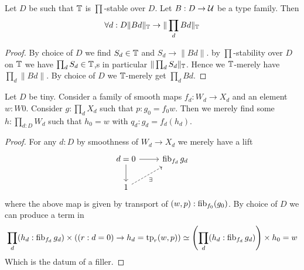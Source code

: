 \begin{lemma}{\label{lemma:TinyStrongLocalChoice}}
	Let $D$ be such that $\mathbb{T}$ is $\prod$-stable over $D$. Let $B : D \to \mathcal{U}$ be a type family. Then
	\[
	\forall d:D \|B d\|_{\mathbb{T}} \to \| \prod_d B d\|_{\mathbb{T}}
	\]		
\end{lemma}
\begin{proof}
	By choice of $D$ we find $S_d \in \mathbb{T}$ and $S_d \to \|B d\|$. by $\prod$-stability over $D$ on $\mathbb{T}$ we have $\prod_d S_d \in \mathbb{T}$,s  in particular $\| \prod_d S_d \|_{\mathbb{T}}$. Hence we $\mathbb{T}$-merely have $\prod_d \| B d\|.$ By choice of $D$ we $\mathbb{T}$-merely get $\prod_d B d$. 
	
\end{proof}
\begin{lemma}[NEEDED?]
	Let $D$ be tiny. Consider a family of smooth maps $f_d : W_d \to X_d$ and an element $w : W 0$.
	Consider $g : \prod_d X_d$ such that $p : g_0 = f_0 w$. Then we merely find some $h : \prod_{d: D} W_d$ such that $h_0 = w$ with $q_d : g_d = f_d (h_d) $.
	
\end{lemma}
\begin{proof}
	For any $d : D$ by smoothness of $W_d \to X_d$ we merely have a lift 
	\[\begin{tikzcd}
		{d=0} & {\fib_{f_d} g_d} \\
		1
		\arrow[from=1-1, to=1-2]
		\arrow[from=1-1, to=2-1]
		\arrow["\exists"', dashed, from=2-1, to=1-2]
	\end{tikzcd}\]
	where the above map is given by transport of $(w , p) : \operatorname{fib}_{f_0}(g_0)$.
	By choice of $D$ we can produce a term in 
	\[
	\prod_d (h_d : \operatorname{fib}_{f_d} g_d) \times ((r : d = 0) \to  h_d = \mathrm{tp}_r(w,p)) \simeq \left(\prod_d (h_d : \operatorname{fib}_{f_d} g_d) \right) \times h_0 = w 
	\]
	Which is the datum of a filler.
\end{proof}

